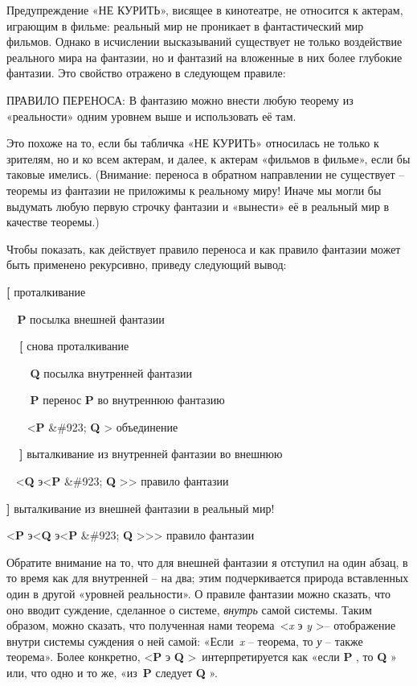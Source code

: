\documentclass[../main.tex]{subfiles}
\begin{document}
Предупреждение «НЕ КУРИТЬ», висящее в кинотеатре, не относится к актерам, играющим в фильме: реальный мир не проникает в фантастический мир фильмов. Однако в исчислении высказываний существует не только воздействие реального мира на фантазии, но и фантазий на вложенные в них более глубокие фантазии. Это свойство отражено в следующем правиле:

ПРАВИЛО ПЕРЕНОСА: В фантазию можно внести любую теорему из «реальности» одним уровнем выше и использовать её там.

Это похоже на то, если бы табличка «НЕ КУРИТЬ» относилась не только к зрителям, но и ко всем актерам, и далее, к актерам «фильмов в фильме», если бы таковые имелись. (Внимание: переноса в обратном направлении не существует \--- теоремы из фантазии не приложимы к реальному миру! Иначе мы могли бы выдумать любую первую строчку фантазии и «вынести» её в реальный мир в качестве теоремы.)

Чтобы показать, как действует правило переноса и как правило фантазии может быть применено рекурсивно, приведу следующий вывод:

\textbf{{[}} проталкивание

\textbf{~ P} посылка внешней фантазии

\textbf{~~{[}} снова проталкивание

\textbf{~~~ Q} посылка внутренней фантазии

\textbf{~~~ P} перенос \textbf{P} во внутреннюю фантазию

~~~ \textless{}\textbf{P} \&\#923; \textbf{Q} \textgreater{} объединение

\textbf{~~{]}} выталкивание из внутренней фантазии во внешнюю

~ \textless{}\textbf{Q} э\textless{}\textbf{P} \&\#923; \textbf{Q} \textgreater\textgreater{} правило фантазии

\textbf{{]}} выталкивание из внешней фантазии в реальный мир!

\textless{}\textbf{P} э\textless{}\textbf{Q} э\textless{}\textbf{P} \&\#923; \textbf{Q} \textgreater\textgreater\textgreater{} правило фантазии

Обратите внимание на то, что для внешней фантазии я отступил на один абзац, в то время как для внутренней \--- на два; этим подчеркивается природа вставленных один в другой «уровней реальности». О правиле фантазии можно сказать, что оно вводит суждение, сделанное о системе, \emph{внутрь} самой системы. Таким образом, можно сказать, что полученная нами теорема~\textless{}\emph{x} э \emph{y} \textgreater \--- отображение внутри системы суждения о ней самой: «Если~\emph{x} \--- теорема, то \emph{у} \--- также теорема». Более конкретно, \textless{}\textbf{P} э \textbf{Q} \textgreater~интерпретируется как «если \textbf{P} , то \textbf{Q} » или, что одно и то же, «из~\textbf{P} следует \textbf{Q} ».
\end{document}
